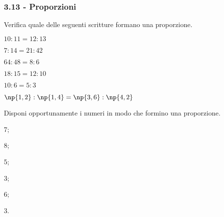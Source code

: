 \subsubsection*{3.13 - Proporzioni}

\begin{esercizio}
 \label{ese:3.117}
 Verifica quale delle seguenti scritture formano una proporzione.
\begin{multicols}{3}
 \begin{enumeratea}
 \item $10:11=12:13$ %
 \item $7:14=21:42$ %
 \item $64:48=8:6$ %
 \item $18:15=12:10$ %
 \item $10:6=5:3$ %
 \item $\np{1,2}:\np{1,4}=\np{3,6}:\np{4,2}$ %
 \end{enumeratea}
 \end{multicols}
\end{esercizio}

\begin{esercizio}
 \label{ese:3.118}
Disponi opportunamente i numeri in modo che formino una proporzione.
\begin{multicols}{3}
\begin{enumeratea}
\item 7;
\item 8;
\item 5;
\item 3;
\item 6;
\item 3.
\end{enumeratea}
 \end{multicols}
\end{esercizio}

